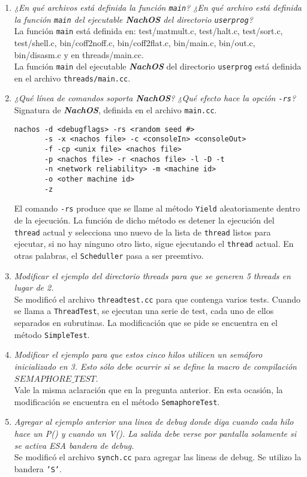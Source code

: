 \begin{enumerate}
\item \textit{¿En qué archivos está definida la función \texttt{main}? ¿En qué archivo está definida la función \texttt{main} del ejecutable \textbf{\textit{NachOS}} del directorio \texttt{userprog}?}\\
La función \texttt{main} está definida en: test/matmult.c, test/halt.c, test/sort.c, test/shell.c, bin/coff2noff.c, bin/coff2flat.c, bin/main.c, bin/out.c, bin/disasm.c y en threads/main.cc.\\
La función \texttt{main} del ejecutable \textbf{\textit{NachOS}} del directorio \texttt{userprog} está definida en el archivo \texttt{threads/main.cc}.\\
\item \textit{¿Qué línea de comandos soporta \textbf{\textit{NachOS}}? ¿Qué efecto hace la opción \texttt{-rs}?}
Signatura de \textbf{\textit{NachOS}}, definida en el archivo \texttt{main.cc}.
\begin{lstlisting}[style=C]
nachos -d <debugflags> -rs <random seed #>
       -s -x <nachos file> -c <consoleIn> <consoleOut>
       -f -cp <unix file> <nachos file>
       -p <nachos file> -r <nachos file> -l -D -t
       -n <network reliability> -m <machine id>
       -o <other machine id>
       -z
\end{lstlisting}
El comando \texttt{-{}rs} produce que se llame al método \texttt{Yield} aleatoriamente dentro de la ejecución. La función de dicho método es detener la ejecución del \texttt{thread} actual y selecciona uno nuevo de la lista de \texttt{thread} listos para ejecutar, si no hay ninguno otro listo, sigue ejecutando el \texttt{thread} actual. En otras palabras, el \texttt{Scheduller} pasa a ser preemtivo.\\

\item \textit{Modificar el ejemplo del directorio threads para que se generen 5 threads en lugar de 2.}\\
Se modificó el archivo \texttt{threadtest.cc} para que contenga varios tests. Cuando se llama a \texttt{ThreadTest}, se ejecutan una serie de test, cada uno de ellos separados en subrutinas. La modificación que se pide se encuentra en el método \texttt{SimpleTest}.
\item \textit{Modificar el ejemplo para que estos cinco hilos utilicen un semáforo inicializado en 3. Esto sólo debe ocurrir si se define la macro de compilación $SEMAPHORE\_TEST$.}\\
Vale la misma aclaración que en la pregunta anterior. En esta ocasión, la modificación se encuentra en el método \texttt{SemaphoreTest}.
\item \textit{Agregar al ejemplo anterior una linea de debug donde diga cuando cada hilo hace un P() y cuando un V(). La salida debe verse por pantalla solamente si se activa ESA bandera de debug.}\\
Se modificó el archivo \texttt{synch.cc} para agregar las lineas de debug. Se utilizo la bandera \texttt{'S'}.
\end{enumerate}